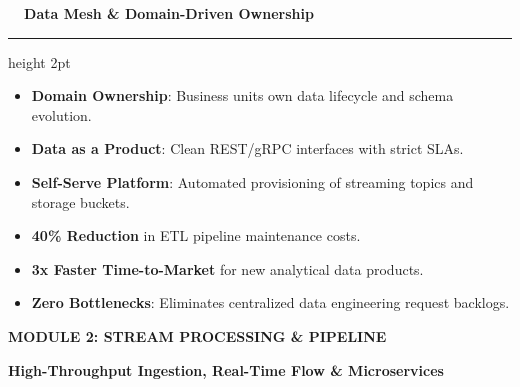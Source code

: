 \documentclass[landscape]{slides}
\newcommand{\slidetitle}[1]{%
  {\Large\bfseries\color{NavyDark} #1}\par\vspace{0.3em}%
  {\color{TealAccent}\hrule height 2pt}\vspace{0.6em}%
}
\newcommand{\sectionbanner}[2]{%
  \begin{center}
    \vspace*{1.2em}
    \begin{tcolorbox}[colback=NavyDark,colframe=TealAccent,arc=4pt,boxrule=1.5pt,center,width=0.9\textwidth]
      \centering
      \vspace{0.4em}
      {\Huge\bfseries\color{white} #1}\par\vspace{0.5em}
      {\large\color{TealAccent}\bfseries #2}
      \vspace{0.4em}
    \end{tcolorbox}
  \end{center}
}
\begin{document}
\begin{slide}
\slidetitle{\faLayerGroup~~Data Mesh \& Domain-Driven Ownership}

\begin{minipage}[t]{0.48\textwidth}
  \begin{tcolorbox}[colback=CardBg,colframe=NavyDark,title=\textbf{\faKey~~Core Architectural Principles}]
    \small
    \begin{itemize}
      \item \textbf{Domain Ownership}: Business units own data lifecycle and schema evolution.
      \item \textbf{Data as a Product}: Clean REST/gRPC interfaces with strict SLAs.
      \item \textbf{Self-Serve Platform}: Automated provisioning of streaming topics and storage buckets.
    \end{itemize}
  \end{tcolorbox}
\end{minipage}%
\hfill
\begin{minipage}[t]{0.48\textwidth}
  \begin{tcolorbox}[colback=CardBg,colframe=TealAccent,title=\textbf{\faChartLine~~Quantifiable Business Impact}]
    \small
    \begin{itemize}
      \item \textbf{40\% Reduction} in ETL pipeline maintenance costs.
      \item \textbf{3x Faster Time-to-Market} for new analytical data products.
      \item \textbf{Zero Bottlenecks}: Eliminates centralized data engineering request backlogs.
    \end{itemize}
  \end{tcolorbox}
\end{minipage}
\end{slide}

\begin{slide}
\sectionbanner{MODULE 2: STREAM PROCESSING \& PIPELINE}{High-Throughput Ingestion, Real-Time Flow \& Microservices}
\end{slide}
\end{document}
